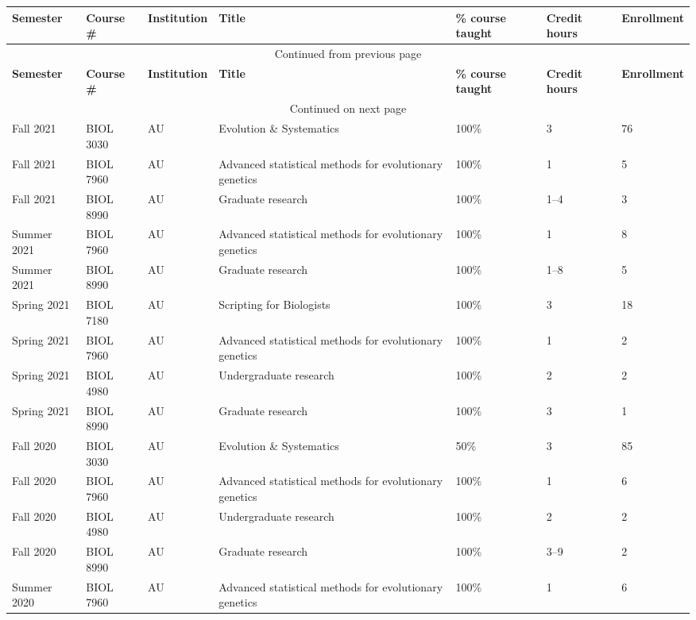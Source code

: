 {\sffamily\small
{}
\begin{longtable}[l]{ p{0.79in} p{0.65in} p{0.60in} p{1.7in} p{0.58in} p{0.34in} p{0.70in} }
    \hline
    \textbf{Semester} & \textbf{Course \#} & \textbf{Institution} & \textbf{Title} & \textbf{\% course taught} & \textbf{Credit hours} & \textbf{Enrollment} \\
    \hline
    \endfirsthead
    \multicolumn{7}{c}{{Continued from previous page}} \\
    \hline
    \textbf{Semester} & \textbf{Course \#} & \textbf{Institution} & \textbf{Title} & \textbf{\% course taught} & \textbf{Credit hours} & \textbf{Enrollment} \\
    \hline
    \endhead
    \hline \multicolumn{7}{c}{{Continued on next page}} \\
    \endfoot
    \hline
    \endlastfoot
    Fall 2021 & BIOL 3030 & AU & Evolution \& Systematics & 100\% & 3 & 76 \\
    Fall 2021 & BIOL 7960 & AU & Advanced statistical methods for evolutionary genetics & 100\% & 1 & 5 \\
    Fall 2021 & BIOL 8990 & AU & Graduate research & 100\% & 1--4 & 3 \\ 
    Summer 2021 & BIOL 7960 & AU & Advanced statistical methods for evolutionary genetics & 100\% & 1 & 8 \\
    Summer 2021 & BIOL 8990 & AU & Graduate research & 100\% & 1--8 & 5 \\ 
    Spring 2021 & BIOL 7180 & AU & Scripting for Biologists & 100\% & 3 & 18 \\
    Spring 2021 & BIOL 7960 & AU & Advanced statistical methods for evolutionary genetics & 100\% & 1 & 2 \\
    Spring 2021 & BIOL 4980 & AU & Undergraduate research & 100\% & 2 & 2 \\ 
    Spring 2021 & BIOL 8990 & AU & Graduate research & 100\% & 3 & 1 \\ 
    Fall 2020 & BIOL 3030 & AU & Evolution \& Systematics & 50\% & 3 & 85 \\
    Fall 2020 & BIOL 7960 & AU & Advanced statistical methods for evolutionary genetics & 100\% & 1 & 6 \\
    Fall 2020 & BIOL 4980 & AU & Undergraduate research & 100\% & 2 & 2 \\ 
    Fall 2020 & BIOL 8990 & AU & Graduate research & 100\% & 3--9 & 2 \\ 
    Summer 2020 & BIOL 7960 & AU & Advanced statistical methods for evolutionary genetics & 100\% & 1 & 6 \\

\end{longtable}}
